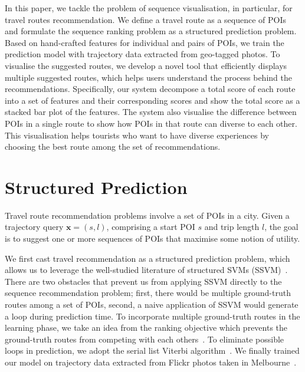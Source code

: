 \documentclass[sigconf]{acmart}
\begin{document}
In this paper, we tackle the problem of sequence visualisation, in particular, for travel routes recommendation. 
We define a travel route as a sequence of POIs and formulate the sequence ranking problem as a structured prediction problem. 
Based on hand-crafted features for individual and pairs of POIs, we train the prediction model with trajectory data extracted from geo-tagged photos. 
To visualise the suggested routes, we develop a novel tool that efficiently displays multiple suggested routes, which helps users understand the process behind the recommendations.
Specifically, our system decompose a total score of each route into a set of features and their corresponding scores and show the total score as a stacked bar plot of the features.
The system also visualise the difference between POIs in a single route to show how POIs in that route can diverse to each other. 
This visualisation helps tourists who want to have diverse experiences by choosing the best route among the set of recommendations.

\section{Structured Prediction}
Travel route recommendation problems involve a set of POIs in a city. 
Given a trajectory query $\mathbf{x} = (s, l)$, comprising a start POI $s$ and trip length $l$, the goal is to suggest one or more sequences of POIs that maximise some notion of utility.

We first cast travel recommendation as a structured prediction problem, which allows us to leverage the well-studied literature of structured SVMs (SSVM)~\cite{tsochantaridis2005large,joachims2009predicting}. 
There are two obstacles that prevent us from applying SSVM directly to the sequence recommendation problem; first, there would be multiple ground-truth routes among a set of POIs, second, a naive application of SSVM would generate a loop during prediction time. 
To incorporate multiple ground-truth routes in the learning phase, we take an idea from the ranking objective which prevents the ground-truth routes from competing with each others~\cite{rendle2009bpr}. 
To eliminate possible loops in prediction, we adopt the serial list Viterbi algorithm~\cite{seshadri1994list,nill1995list,nilsson2001sequentially}.
We finally trained our model on trajectory data extracted from Flickr photos taken in Melbourne~\cite{chen2016learning}.
\end{document}

